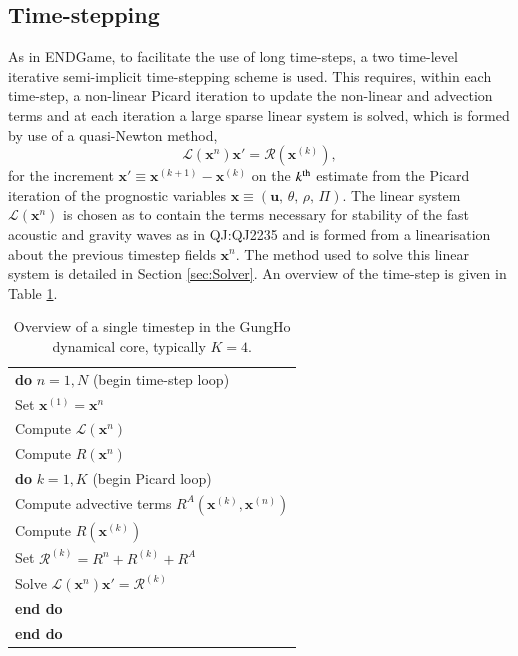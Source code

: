 \documentclass[review,times]{elsarticle}
\providecommand{\tabularnewline}{\\}
\begin{document}
\subsection{Time-stepping\label{sec:sub:timestepping}}
As in ENDGame, to facilitate the use of long time-steps, a two time-level 
iterative semi-implicit time-stepping scheme is used. This requires, within each 
time-step, a non-linear Picard iteration to update the non-linear and advection terms 
and at each iteration a large sparse linear system is solved, which is formed by 
use of a quasi-Newton method,
%
\begin{equation}
\mathcal{L}\left(\mathbf{x}^n\right)\mathbf{x}' = \mathcal{R}\left(\mathbf{x}^{(k)}\right),\label{eq:quasi-newton}
\end{equation}
%
for the increment $\mathbf{x}'\equiv\mathbf{x}^{(k+1)}-\mathbf{x}^{(k)}$ on the $k^{\rm{th}}$ 
estimate from the Picard iteration of the prognostic variables $\mathbf{x}\equiv\left(\mathbf{u},\,\theta,\,\rho,\,\Pi\right)$. The linear system $\mathcal{L}\left(\mathbf{x}^n\right)$ is chosen as to contain the terms necessary for stability of the fast acoustic and gravity waves as in \cite{}{QJ:QJ2235} and is formed from a linearisation about the previous timestep fields $\mathbf{x}^n$. The method used to solve this linear system is detailed in Section \ref{sec:Solver}. An overview of the 
time-step is given in Table \ref{tab:timestep}.
%
\begin{table}
\begin{centering}
\begin{tabular}{l}
\hline 
\textbf{do} $n=1,N$ (begin time-step loop)\tabularnewline
\hspace{0.5cm}Set $\mathbf{x}^{(1)} = \mathbf{x}^n$\tabularnewline
\hspace{0.5cm}Compute $\mathcal{L}\left(\mathbf{x}^n\right)$\tabularnewline
\hspace{0.5cm}Compute $R\left(\mathbf{x}^n\right)$\tabularnewline
\hspace{0.5cm}\textbf{do} $k=1,K$ (begin Picard loop)\tabularnewline
\hspace{1.0cm}Compute advective terms $R^A\left(\mathbf{x}^{(k)},\mathbf{x}^{(n)}\right)$\tabularnewline
\hspace{1.0cm}Compute $R\left(\mathbf{x}^(k)\right)$\tabularnewline
\hspace{1.0cm}Set $\mathcal{R}^{(k)} = R^n + R^{(k)} + R^A$\tabularnewline

\hspace{1.0cm}Solve $\mathcal{L}\left(\mathbf{x}^n\right)\mathbf{x}' = \mathcal{R}^{(k)}$\tabularnewline
\hspace{0.5cm}\textbf{end do}\tabularnewline
\textbf{end do}\tabularnewline
\hline
\end{tabular}
\end{centering}
\caption{\label{tab:timestep}Overview of a single timestep in the GungHo dynamical core, typically $K=4$.}
\end{table}
%
\end{document}
